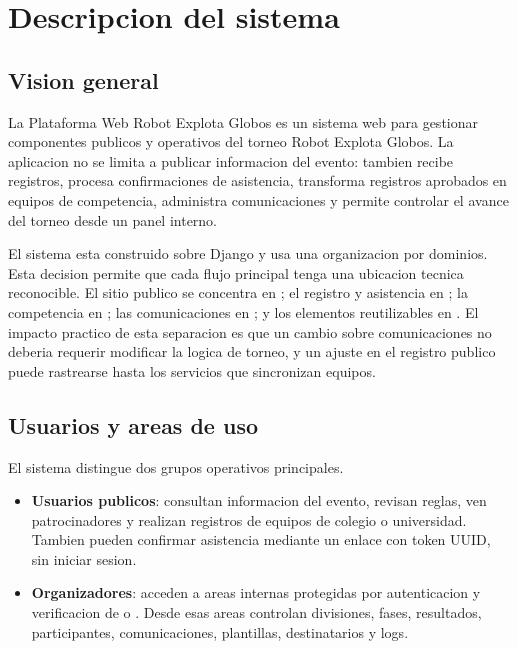 \chapter{Descripcion del sistema}
\label{chap:descripcion-sistema}

\section{Vision general}
\label{sec:descripcion-vision}

La Plataforma Web Robot Explota Globos es un sistema web para gestionar componentes publicos y operativos del torneo Robot Explota Globos. La aplicacion no se limita a publicar informacion del evento: tambien recibe registros, procesa confirmaciones de asistencia, transforma registros aprobados en equipos de competencia, administra comunicaciones y permite controlar el avance del torneo desde un panel interno.

El sistema esta construido sobre Django y usa una organizacion por dominios. Esta decision permite que cada flujo principal tenga una ubicacion tecnica reconocible. El sitio publico se concentra en ; el registro y asistencia en ; la competencia en ; las comunicaciones en ; y los elementos reutilizables en . El impacto practico de esta separacion es que un cambio sobre comunicaciones no deberia requerir modificar la logica de torneo, y un ajuste en el registro publico puede rastrearse hasta los servicios que sincronizan equipos.

\section{Usuarios y areas de uso}
\label{sec:descripcion-usuarios}

El sistema distingue dos grupos operativos principales.

\begin{itemize}
  \item \textbf{Usuarios publicos}: consultan informacion del evento, revisan reglas, ven patrocinadores y realizan registros de equipos de colegio o universidad. Tambien pueden confirmar asistencia mediante un enlace con token UUID, sin iniciar sesion.
  \item \textbf{Organizadores}: acceden a areas internas protegidas por autenticacion y verificacion de  o . Desde esas areas controlan divisiones, fases, resultados, participantes, comunicaciones, plantillas, destinatarios y logs.
\end{itemize}

